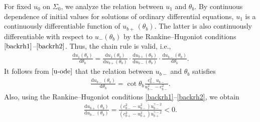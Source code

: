 \documentclass[10pt,a4paper]{amsart}
\newcommand{\dd}{\mathrm{d}}
\numberwithin{equation}{section}
\begin{document}
For fixed $u_0$ on $\Sigma_0$, we analyze the relation between $u_1$ and $\theta_b$. By continuous dependence of initial values for solutions of ordinary differential equations, $u_1$ is a continuously differentiable function of $u_{b+}\, (\theta_b)$. The latter is also continuously differentiable with respect to $u_-(\theta_b)$ by the Rankine–Hugoniot conditions $\eqref{backrh1}$--$ \eqref{backrh2}$. Thus, the chain rule is valid, i.e.,
	\begin{align*}
		\frac{\dd u_1(\theta_b)}{\dd \theta_b }=\frac{\dd u_1(\theta_b)}{\dd u_{b+}(\theta_b) }\cdot\frac{\dd u_{b+}(\theta_b)}{\dd u_{b-}(\theta_b) }\cdot\frac{\dd u_{b-}(\theta_b)}{\dd \theta_b }.
	\end{align*}
It follows from $\eqref{u-ode}$ that the relation between $u_{b-}$ and $\theta_b$ satisfies
	\begin{align}
		\frac{\dd u_{b-}(\theta_b)}{\dd \theta_b }=\cot\theta_b\frac{c_{b-}^2u_{b-}}{u_{b-}^2-c_{b-}^2}.\label{du-dtheta}
	\end{align}
Also, using the Rankine–Hugoniot conditions \eqref{backrh1}--\eqref{backrh2}, we obtain
	\begin{align}
	\frac{\dd u_{b+}(\theta_b)}{\dd u_{b-}(\theta_b) }=\frac{(c_{b-}^2-u_{b-}^2)u_{b-}^{\gamma-2}}{(c_{b+}^2-u_{b+}^2)u_{b+}^{\gamma-2}}<0.\label{du+du-}
	\end{align}
\end{document}
